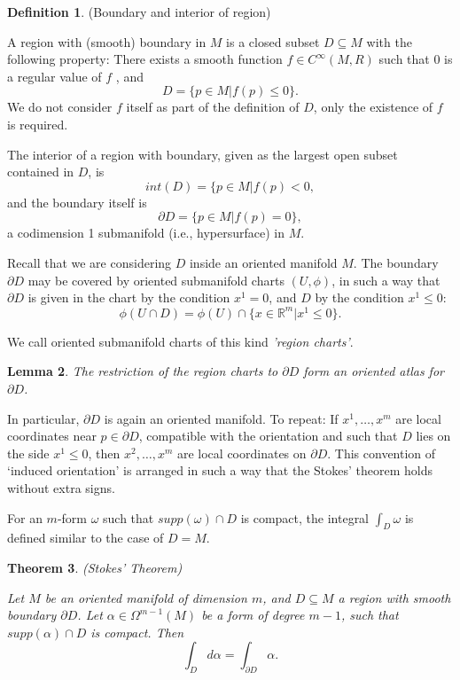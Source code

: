\documentclass{article}
\newtheorem{theorem}{Theorem}[section]
\newtheorem{lemma}[theorem]{Lemma}
\theoremstyle{definition}
\newtheorem{defn}[theorem]{Definition}
\newenvironment{definition}
  {\vspace{8pt}\begin{mdframed}[backgroundcolor=blueish,innertopmargin=4]\begin{defn}}
  {\end{defn}\end{mdframed}\vspace{4pt}}
\begin{document}
\begin{definition} (Boundary and interior of region)

A region with (smooth) boundary in $M$ is a closed subset $D \subseteq M$ with the following property: There exists a smooth function $f \in C^\infty(M,R)$ such that $0$ is a regular value of $f$ , and
\[
    D = \{p \in M | f(p) \leq 0 \}.
\]
We do not consider $f$ itself as part of the definition of $D$, only the existence of $f$ is required. 

The interior of a region with boundary, given as the largest open subset contained in $D$, is 
\[
   int(D) = \{p \in M| f(p) < 0,
\]
and the boundary itself is
\[
   \partial D = \{p \in M| f(p) = 0 \},
\]
a codimension 1 submanifold (i.e., hypersurface) in $M$.

\end{definition}


Recall that we are considering $D$ inside an oriented manifold $M$. The boundary $\partial D$ may be covered by oriented submanifold charts $(U,\phi)$, in such a way that $\partial D$ is given in the chart by the condition $x^1 = 0$, and $D$ by the condition $x^1 \leq 0$:
\[ 
    \phi (U \cap D) = \phi (U) \cap \{x \in \mathbb R^m | x ^1 \leq 0 \}.
\]

We call oriented submanifold charts of this kind \textit{'region charts'}.

\begin{lemma}
The restriction of the region charts to $\partial D$ form an oriented atlas for $\partial D$.
\end{lemma}
In particular, $\partial D$ is again an oriented manifold. To repeat: If $x^1 ,\dots, x^m$ are local coordinates near $p \in \partial D$, compatible with the orientation and such that $D$ lies on the side $x^1 \leq 0$, then $x^2 ,\dots, x^m$ are local coordinates on $\partial D$. This convention of ‘induced orientation’ is arranged in such a way that the Stokes’ theorem holds without extra signs.

For an $m$-form $\omega$ such that $supp(\omega)\cap D$ is compact, the integral $\int_D \omega $ is defined similar to the case of $D = M$.

\begin{theorem} (Stokes' Theorem)


Let $M$ be an oriented manifold of dimension $m$, and $D \subseteq M$ a region with smooth boundary $\partial D$. Let $\alpha \in  \Omega^{m-1} (M)$ be a form of degree $m-1$, such that $supp(\alpha)\cap D$ is compact. Then 
\[
\int_D d\alpha = \int_{\partial D} \alpha.
\]
\end{theorem}
\end{document}
